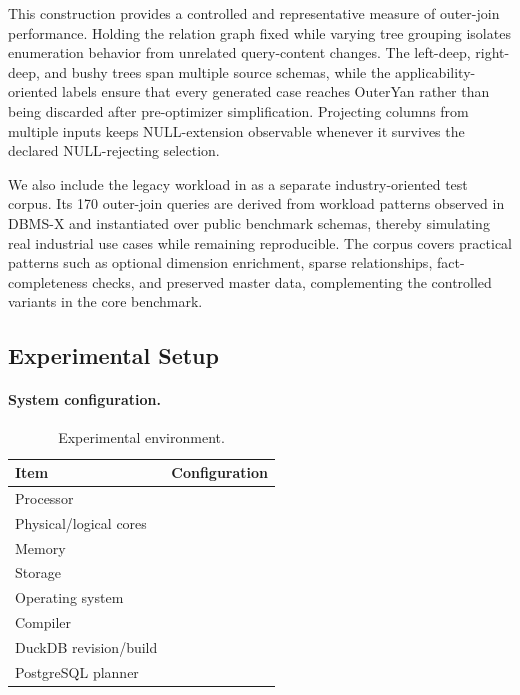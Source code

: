 This construction provides a controlled and representative measure of
outer-join performance. Holding the relation graph fixed while varying tree
grouping isolates enumeration behavior from unrelated query-content changes.
The left-deep, right-deep, and bushy trees span multiple source schemas, while
the applicability-oriented labels ensure that every generated case reaches
OuterYan rather than being discarded after pre-optimizer simplification. Projecting columns from
multiple inputs keeps NULL-extension observable whenever it survives the
declared NULL-rejecting selection.

We also include the legacy workload in
 as a separate industry-oriented test
corpus. Its 170 outer-join queries are derived from workload patterns observed
in DBMS-X and instantiated over public benchmark schemas, thereby simulating
real industrial use cases while remaining reproducible. The corpus covers
practical patterns such as optional dimension enrichment, sparse relationships,
fact-completeness checks, and preserved master data, complementing the
controlled variants in the core benchmark.

\providecommand{\OuterYanBenchmarkFigures}{output/pdf/outeryan_benchmark_figures.pdf}

\subsection{Experimental Setup}
\label{sec:experimental-setup}

\paragraph{System configuration.}

\begin{table}[t]
  \centering
  \small
  \caption{Experimental environment.}
  \label{tab:experimental-system}
  \begin{tabular}{ll}
    \toprule
    Item & Configuration \\
    \midrule
    Processor & \\
    Physical/logical cores & \\
    Memory & \\
    Storage & \\
    Operating system & \\
    Compiler & \\
    DuckDB revision/build & \\
    PostgreSQL planner & \\
    \bottomrule
  \end{tabular}
\end{table}

